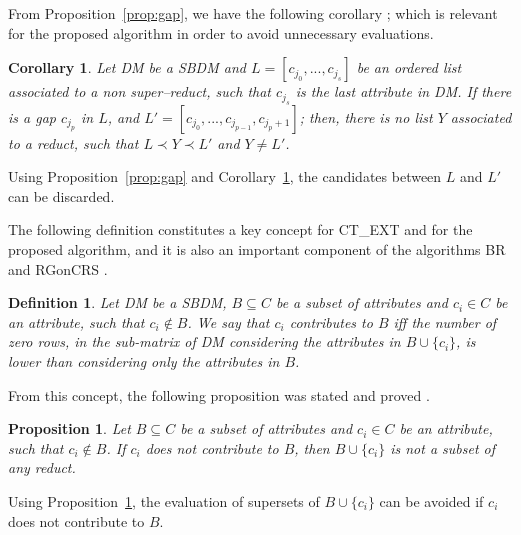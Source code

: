 \documentclass[letterpaper, twoside, openright, 12pt]{book}%
\newtheorem{proposition}{Proposition}
\newtheorem{definition}{Definition}
\newtheorem{corollary}{Corollary}
\begin{document}
	From Proposition~\ref{prop:gap}, we have the following corollary \citep{Santiesteban03}; which is relevant for the proposed algorithm in order to avoid unnecessary evaluations.
	
	\begin{corollary}\label{coro:gap} 
		 Let DM be a SBDM and $L = [c_{j_0},...,c_{j_s}]$ be an ordered list associated to a non super--reduct, such that $c_{j_s}$ is the last attribute in DM. If there is a gap $c_{j_p}$ in $L$, and $L' = [c_{j_0},...,c_{j_{p-1}},c_{j_p+1}]$; then, there is no list $Y$ associated to a reduct, such that $L \prec Y \prec L'$ and $Y \neq L'$.
	\end{corollary}
	
	Using Proposition~\ref{prop:gap} and Corollary~\ref{coro:gap}, the candidates between $L$ and $L'$ can be discarded.
		
	The following definition constitutes a key concept for CT\_EXT \citep{Sanchez07} and for the proposed algorithm, and it is also an important component of the algorithms BR \citep{Lias09} and RGonCRS \citep{WangP07}.
			
	\begin{definition}\label{def:contrib}
		Let DM be a SBDM, $B \subseteq C$ be a subset of attributes and  $c_i \in C$ be an attribute, such that $c_i \notin B$. We say that $c_i$ contributes to $B$ iff the	number of zero rows, in the sub-matrix of DM considering the attributes in $B\cup\{c_i\}$, is lower than considering only the attributes in $B$.
	\end{definition}
			
	From this concept, the following proposition was stated and proved \cite{Sanchez07}.
			
	\begin{proposition}\label{prop:contrib} 
		Let $B \subseteq C$ be a subset of attributes and $c_i \in C$ be an attribute, such that $c_i \notin B$. If $c_i$ does not contribute to $B$, then $B\cup\{c_i\}$ is not a subset of any reduct.
	\end{proposition}
	
	Using Proposition~\ref{prop:contrib}, the evaluation of supersets of $B\cup\{c_i\}$ can be avoided if $c_i$ does not contribute to $B$.
	
\end{document}
